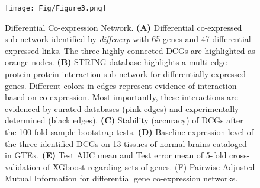 \documentclass[utf8]{FrontiersinHarvard} %
\begin{document}
\begin{figure}[!ht]
    \begin{center}
    \texttt{[image: Fig/Figure3.png]}
    \end{center}
    \caption{Differential Co-expression Network. \textbf{(A)} Differential co-expressed sub-network identified by \textit{diffcoexp} with 65 genes and 47 differential expressed links. The three highly connected DCGs are highlighted as orange nodes. \textbf{(B)} STRING database highlights a multi-edge protein-protein interaction sub-network for differentially expressed genes. Different colors in edges represent evidence of interaction based on co-expression. Most importantly, these interactions are evidenced by curated databases (pink edges) and experimentally determined (black edges). \textbf{(C)} Stability (accuracy) of DCGs after the 100-fold sample bootstrap tests. \textbf{(D)} Baseline expression level of the three identified DCGs on 13 tissues of normal brains cataloged in GTEx. \textbf{(E)} Test AUC mean and Test error mean of 5-fold cross-validation of XGboost regarding sets of genes. (F) Pairwise Adjusted Mutual Information for differential gene co-expression networks.}
    \label{fig:figure3}
\end{figure}
\end{document}
